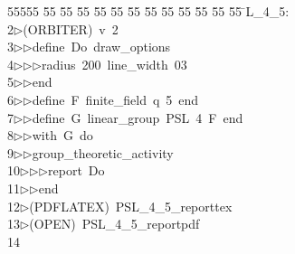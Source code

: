 %
%
\begin{tabbing}
55555 \= 55 \= 55 \= 55 \= 55 \= 55 \= 55 \= 55 \= 55 \= 55 \= 55 \= 55 \= 55 \= \>L\_4\_5:\\[0pt]
2\>$\triangleright$\>(ORBITER)\ v\ 2\ \\[0pt]
3\>$\triangleright$\>$\triangleright$\>define\ Do\ draw\_options\ \\[0pt]
4\>$\triangleright$\>$\triangleright$\>$\triangleright$\>radius\ 200\ line\_width\ 03\ \\[0pt]
5\>$\triangleright$\>$\triangleright$\>end\ \\[0pt]
6\>$\triangleright$\>$\triangleright$\>define\ F\ finite\_field\ q\ 5\ end\ \\[0pt]
7\>$\triangleright$\>$\triangleright$\>define\ G\ linear\_group\ PSL\ 4\ F\ end\ \\[0pt]
8\>$\triangleright$\>$\triangleright$\>with\ G\ do\ \\[0pt]
9\>$\triangleright$\>$\triangleright$\>group\_theoretic\_activity\ \\[0pt]
10\>$\triangleright$\>$\triangleright$\>$\triangleright$\>report\ Do\ \\[0pt]
11\>$\triangleright$\>$\triangleright$\>end\\[0pt]
12\>$\triangleright$\>(PDFLATEX)\ PSL\_4\_5\_reporttex\\[0pt]
13\>$\triangleright$\>(OPEN)\ PSL\_4\_5\_reportpdf\\[0pt]
14\>\end{tabbing}
